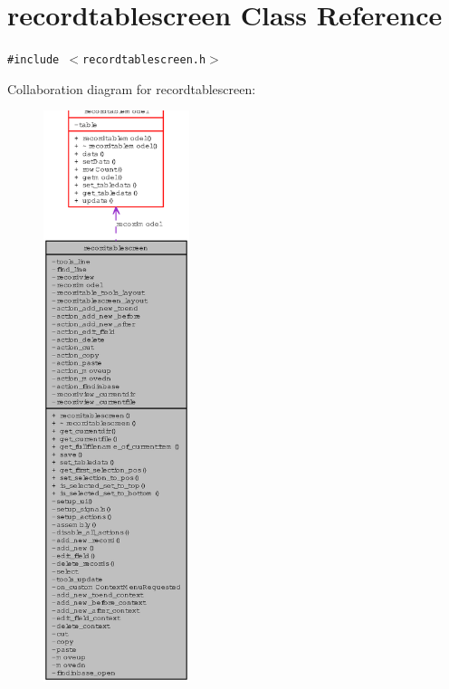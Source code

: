 \section{recordtablescreen Class Reference}
\label{classrecordtablescreen}
{\tt \#include $<$recordtablescreen.h$>$}

Collaboration diagram for recordtablescreen:\begin{figure}[H]
\begin{center}
\leavevmode
\includegraphics[width=121pt]{classrecordtablescreen__coll__graph}
\end{center}
\end{figure}
